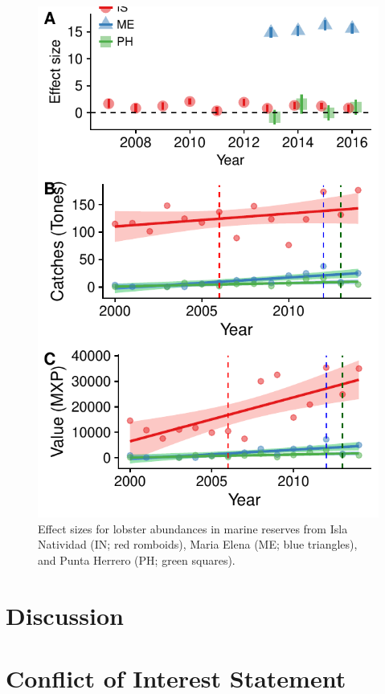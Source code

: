 \documentclass{frontiersSCNS}
\theoremstyle{definition}
\theoremstyle{definition}
\theoremstyle{definition}
\theoremstyle{remark}
\begin{document}
\begin{figure}
\centering
\includegraphics{Villasenor-Derbez_files/figure-latex/unnamed-chunk-4-1.pdf}
\caption{\label{fig:unnamed-chunk-4}\label{fig:lobsters}Effect sizes for
lobster abundances in marine reserves from Isla Natividad (IN; red
romboids), Maria Elena (ME; blue triangles), and Punta Herrero (PH;
green squares).}
\end{figure}

\section{Discussion}\label{discussion}

\section*{Conflict of Interest Statement}
\end{document}
